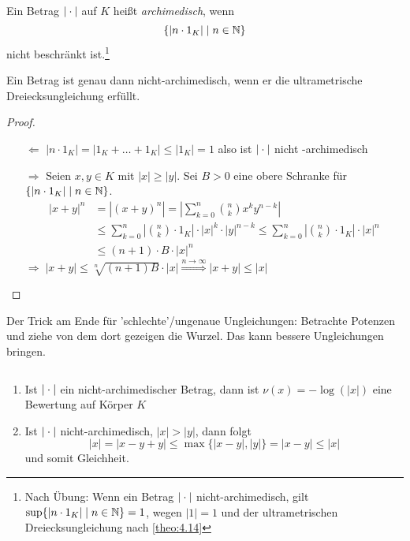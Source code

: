 \documentclass[../main.tex]{subfiles}
\begin{document}
\begin{definition}
    Ein Betrag $|\cdot|$ auf $K$ heißt \emph{archimedisch}, wenn 
    $$\{|n\cdot1_K| \mid n\in \mathbb{N}\}$$
    nicht beschränkt ist.\footnote{Nach Übung: Wenn ein Betrag $|\cdot|$ nicht-archimedisch, gilt $\sup\{|n\cdot1_K| \mid n\in \mathbb{N}\} = 1$, wegen $|1| = 1$ und der ultrametrischen Dreiecksungleichung nach \ref{theo:4.14}}
\end{definition}

\begin{theorem}\label{theo:4.14}
    Ein Betrag ist genau dann nicht-archimedisch, wenn er die ultrametrische Dreiecksungleichung erfüllt.
\end{theorem}
\begin{proof}
    \begin{itemize}
        \item[$\Leftarrow$]
        $|n\cdot 1_K|= |1_K+\dots+1_K| \leq |1_K| = 1$ also ist $|\cdot|$ nicht -archimedisch
        \item[$\Rightarrow$]
        Seien $x,y\in K$ mit \obda $|x|\geq|y|$.
        Sei $B>0$ eine obere Schranke für $\{|n\cdot1_K| \mid n\in \mathbb{N}\}$.
        \begin{align*}
            |x+y|^n &= |(x+y)^n| = \left|\sum_{k=0}^n \binom{n}{k} x^k y^{n-k}\right|\\
            &\leq \sum_{k=0}^n \left|\binom{n}{k}\cdot 1_K\right| \cdot |x|^k \cdot |y|^{n-k} \leq \sum_{k=0}^n \left|\binom{n}{k}\cdot 1_K\right| \cdot |x|^n\\
            &\leq (n+1)\cdot B\cdot |x|^n
        \end{align*}
        $\Longrightarrow\;|x+y| \leq \sqrt[n]{(n+1)B} \cdot |x| \overset{n\rightarrow \infty}{\Rightarrow} |x+y| \leq |x|$
    \end{itemize}
\end{proof}
Der Trick am Ende für 'schlechte'/ungenaue Ungleichungen:
Betrachte Potenzen und ziehe von dem dort gezeigen die Wurzel. Das kann bessere Ungleichungen bringen.
\begin{remark}$ $
    \begin{enumerate}[label=\alph*)]
        \item Ist $|\cdot|$ ein nicht-archimedischer Betrag, dann ist $\nu(x) = -\log(|x|)$ eine Bewertung auf Körper $K$
        \item Ist $|\cdot|$ nicht-archimedisch, $|x|> |y|$, dann folgt 
        $$|x| = |x-y+y|\leq \max\{|x-y|,|y|\} = |x-y| \leq |x|$$
        und somit Gleichheit.
    \end{enumerate}
\end{remark}
\end{document}

